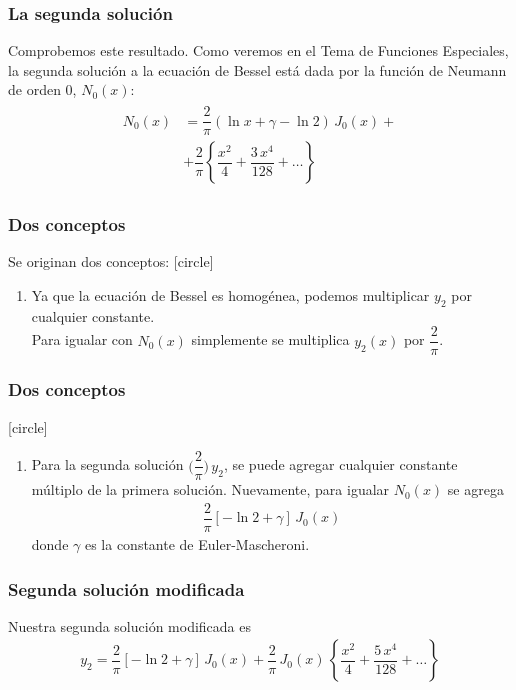 \begin{frame}
\frametitle{La segunda solución}
Comprobemos este resultado. Como veremos en el Tema de Funciones Especiales, la segunda solución a la ecuación de Bessel está dada por la función de Neumann de orden $0$, $N_{0}(x)$:
\begin{align}
\begin{aligned}
N_{0}(x) &= \dfrac{2}{\pi} (\ln x + \gamma - \ln 2) \,J_{0} (x) + \\
&+ \dfrac{2}{\pi} \left\{ \dfrac{x^{2}}{4} + \dfrac{3 \, x^{4}}{128} + \ldots   \right\}
\end{aligned}
\label{eq:ecuacion_09_142d}
\end{align}
\end{frame}
\begin{frame}
\frametitle{Dos conceptos}
Se originan dos conceptos:
[circle]
\begin{enumerate}
\item Ya que la ecuación de Bessel es homogénea, podemos multiplicar $y_{2}$ por cualquier constante. 
\\
\bigskip
Para igualar con $N_{0}(x)$ simplemente se multiplica $y_{2}(x)$ por $\dfrac{2}{\pi}$.
\seti
\end{enumerate}
\end{frame}
\begin{frame}
\frametitle{Dos conceptos}
[circle]
\begin{enumerate}
\conti    
\item Para la segunda solución $\bigg( \dfrac{2}{\pi} \bigg) \, y_{2}$, se puede agregar cualquier constante múltiplo de la primera solución. Nuevamente, para igualar $N_{0}(x)$ se agrega
\begin{align*}
\dfrac{2}{\pi} [- \ln 2 + \gamma] \, J_{0} (x)
\end{align*}
donde $\gamma$ es la constante de Euler-Mascheroni.
\end{enumerate}
\end{frame}
\begin{frame}
\frametitle{Segunda solución modificada}
Nuestra segunda solución modificada es
\begin{align}
y_{2} = \dfrac{2}{\pi} [- \ln 2 + \gamma] \, J_{0} (x) + \dfrac{2}{\pi} \, J_{0} (x) \, \left\{ \dfrac{x^{2}}{4} + \dfrac{5 \, x^{4}}{128} + \ldots   \right\}
\label{eq:ecuacion_09_142e}
\end{align}
\end{frame}

